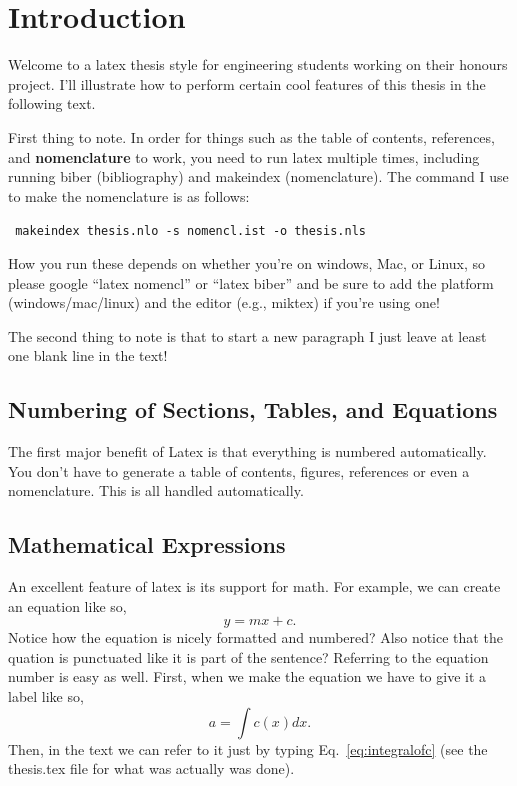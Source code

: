 \documentclass[12pt,MEng]{UoAThesis}
\begin{document}
\chapter{Introduction}
Welcome to a latex thesis style for engineering students working on
their honours project. I'll illustrate how to perform certain cool
features of this thesis in the following text.

First thing to note. In order for things such as the table of
contents, references, and {\bf nomenclature} to work, you need to run
latex multiple times, including running biber (bibliography)
and makeindex (nomenclature). The command I use to make the
nomenclature is as follows:

{\tt
  makeindex thesis.nlo -s nomencl.ist -o thesis.nls
}

How you run these depends on whether you're on windows, Mac, or Linux,
so please google ``latex nomencl'' or ``latex biber'' and be sure to
add the platform (windows/mac/linux) and the editor (e.g., miktex) if
you're using one!

The second thing to note is that to start a new paragraph I just
leave at least one blank line in the text!

\section{Numbering of Sections, Tables, and Equations}
The first major benefit of Latex is that everything is numbered
automatically. You don't have to generate a table of contents,
figures, references or even a nomenclature. This is all handled
automatically.

\section{\label{sec:math} Mathematical Expressions}
An excellent feature of latex is its support for math. For example, we
can create an equation like so,
\begin{equation}
  y = mx+c.
\end{equation}
Notice how the equation is nicely formatted and numbered? Also notice
that the quation is punctuated like it is part of the sentence?
Referring to the equation number is easy as well. First, when we make
the equation we have to give it a label like so,
\begin{equation}\label{eq:integralofc}
  a = \int c(x)dx.
\end{equation}
Then, in the text we can refer to it just by typing
Eq.~\ref{eq:integralofc} (see the thesis.tex file for what was
actually was done).
\end{document}
